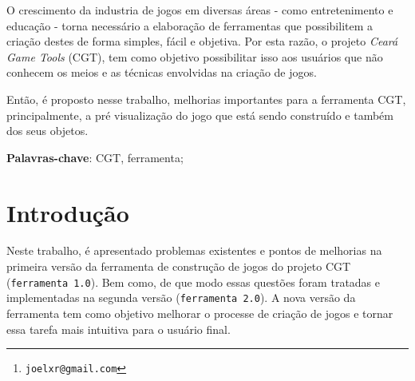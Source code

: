 \documentclass[12pt,twoside,openright,a4paper,english,brazil,sumario=tradicional]{abntex2}
\author{Joel Xavier Rocha\thanks{\texttt{joelxr@gmail.com}}}
\begin{document}
\frenchspacing
\imprimircapa
\imprimirfolhaderosto*

%     

% 

\begin{agradecimentos}

\end{agradecimentos}

\setlength{\absparsep}{18pt}
\begin{resumo}
O crescimento da industria de jogos em diversas áreas - como entretenimento e educação - torna necessário a elaboração de ferramentas que possibilitem a criação destes de forma simples, fácil e objetiva. Por esta razão, o projeto \emph{Ceará Game Tools} (CGT), tem como objetivo possibilitar isso aos usuários que não conhecem os meios e as técnicas envolvidas na criação de jogos.

Então, é proposto nesse trabalho, melhorias importantes para a ferramenta CGT, principalmente, a pré visualização do jogo que está sendo construído e também dos seus objetos.

\vspace{\onelineskip}
\noindent
\textbf{Palavras-chave}: CGT, ferramenta;
\end{resumo}

\listoffigures*
\cleardoublepage

\listoftables*
\cleardoublepage

\tableofcontents*
\cleardoublepage

\textual

\chapter{Introdução} %
\label{chap:introducao}

Neste trabalho, é apresentado problemas existentes e pontos de melhorias na primeira versão da ferramenta de construção de jogos do projeto CGT (\texttt{ferramenta 1.0}). Bem como, de que modo essas questões foram tratadas e implementadas na segunda versão (\texttt{ferramenta 2.0}). A nova versão da ferramenta tem como objetivo melhorar o processe de criação de jogos e tornar essa tarefa mais intuitiva para o usuário final.
\end{document}
